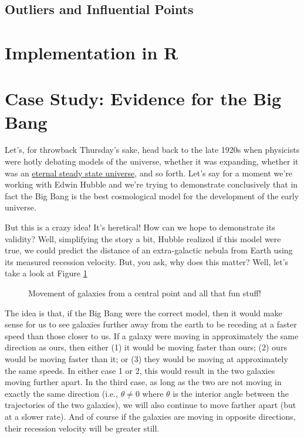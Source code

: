 \subsection{Outliers and Influential Points}

\section{Implementation in R}

\section{Case Study: Evidence for the Big Bang}

Let's, for throwback Thursday's sake, head back to the late 1920s when physicists were hotly debating models of the universe, whether it was expanding, whether it was an \href{http://en.wikipedia.org/wiki/Steady_state_theory}{eternal steady state universe}, and so forth. Let's say for a moment we're working with Edwin Hubble and we're trying to demonstrate conclusively that in fact the Big Bang is the best cosmological model for the development of the early universe.

But this is a crazy idea! It's heretical! How can we hope to demonstrate its validity? Well, simplifying the story a bit, Hubble realized if this model were true, we could predict the distance of an extra-galactic nebula from Earth using its measured recession velocity. But, you ask, why does this matter? Well, let's take a look at Figure \ref{fig:regression06}

\begin{figure}[htp]

\caption{Movement of galaxies from a central point and all that fun stuff!}
\label{fig:regression06}
\end{figure}

The idea is that, if the Big Bang were the correct model, then it would make sense for us to see galaxies further away from the earth to be receding at a faster speed than those closer to us. If a galaxy were moving in approximately the same direction as ours, then either (1) it would be moving faster than ours; (2) ours would be moving faster than it; or (3) they would be moving at approximately the same speeds. In either case 1 or 2, this would result in the two galaxies moving further apart. In the third case, as long as the two are not moving in exactly the same direction (i.e., $\theta \neq 0$ where $\theta$ is the interior angle between the trajectories of the two galaxies), we will also continue to move farther apart (but at a slower rate). And of course if the galaxies are moving in opposite directions, their recession velocity will be greater still.

